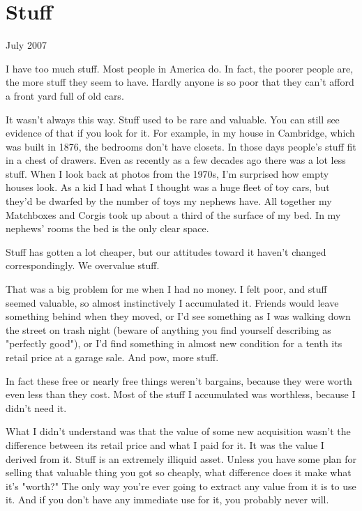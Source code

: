 \chapter{Stuff}



July 2007

I have too much stuff.  Most people in America do.  In fact, the
poorer people are, the more stuff they seem to have.  Hardly anyone
is so poor that they can't afford a front yard full of old cars.

It wasn't always this way.  Stuff used to be rare and valuable.
You can still see evidence of that if you look for it.  For example,
in my house in Cambridge, which was built in 1876, the bedrooms
don't have closets.  In those days people's stuff fit in a chest
of drawers.  Even as recently as a few decades ago there was a lot
less stuff.  When I look back at photos from the 1970s, I'm surprised
how empty houses look.  As a kid I had what I thought was a huge
fleet of toy cars, but they'd be dwarfed by the number of toys my
nephews have.  All together my Matchboxes and Corgis took up about
a third of the surface of my bed.  In my nephews' rooms the bed is
the only clear space.

Stuff has gotten a lot cheaper, but our attitudes toward it haven't
changed correspondingly.  We overvalue stuff.

That was a big problem
for me when I had no money.  I felt poor, and stuff seemed valuable,
so almost instinctively I accumulated it.  Friends would leave
something behind when they moved, or I'd see something as I was
walking down the street on trash night (beware of anything you find
yourself describing as "perfectly good"), or I'd find something in
almost new condition for a tenth its retail price at a garage sale.
And pow, more stuff.

In fact these free or nearly free things weren't bargains, because
they were worth even less than they cost.  Most of the stuff I
accumulated was worthless, because I didn't need it.

What I didn't understand was that the value of some new acquisition
wasn't the difference between its retail price and what I paid for
it.  It was the value I derived from it.  Stuff is an extremely
illiquid asset.  Unless you have some plan for selling that valuable
thing you got so cheaply, what difference does it make what it's
"worth?"  The only way you're ever going to extract any value from
it is to use it.  And if you don't have any immediate use for it,
you probably never will.

